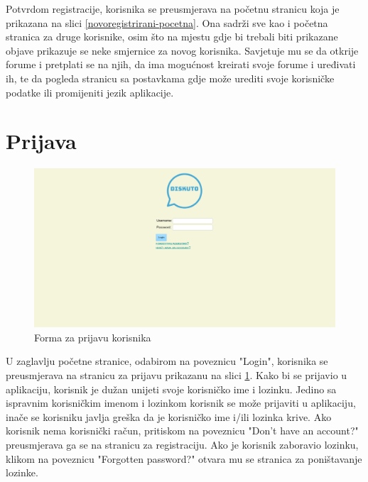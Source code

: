 \documentclass{foi}
\begin{document}
Potvrdom registracije, korisnika se preusmjerava na početnu stranicu koja je prikazana na slici \ref{novoregistrirani-pocetna}. Ona sadrži sve kao i početna stranica za druge korisnike, osim što na mjestu gdje bi trebali biti prikazane objave prikazuje se neke smjernice za novog korisnika. Savjetuje mu se da otkrije forume i pretplati se na njih, da ima mogućnost kreirati svoje forume i uređivati ih, te da pogleda stranicu sa postavkama gdje može urediti svoje korisničke podatke ili promijeniti jezik aplikacije.

\section{Prijava}

\begin{figure}[h!]
    \centering
    \includegraphics[width=1\textwidth]{slike/prijava.png}
    \caption{Forma za prijavu korisnika}
    \label{prijava}
\end{figure}

U zaglavlju početne stranice, odabirom na poveznicu "Login", korisnika se preusmjerava na stranicu za prijavu prikazanu na slici \ref{prijava}. Kako bi se prijavio u aplikaciju, korisnik je dužan unijeti svoje korisničko ime i lozinku. Jedino sa ispravnim korisničkim imenom i lozinkom korisnik se može prijaviti u aplikaciju, inače se korisniku javlja greška da je korisničko ime i/ili lozinka krive. Ako korisnik nema korisnički račun, pritiskom na poveznicu "Don't have an account?" preusmjerava ga se na stranicu za registraciju. Ako je korisnik zaboravio lozinku, klikom na poveznicu "Forgotten password?" otvara mu se stranica za poništavanje lozinke.
\end{document}
